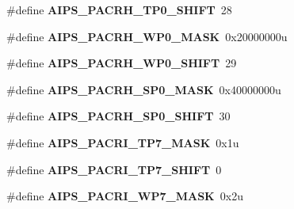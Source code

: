 \begin{DoxyCompactItemize}
\item 
\#define {\bfseries A\+I\+P\+S\+\_\+\+P\+A\+C\+R\+H\+\_\+\+T\+P0\+\_\+\+S\+H\+I\+FT}~28\hypertarget{group__AIPS__Register__Masks_ga7dca4b86d51d4bb3a756d466936c57b3}{}\label{group__AIPS__Register__Masks_ga7dca4b86d51d4bb3a756d466936c57b3}

\item 
\#define {\bfseries A\+I\+P\+S\+\_\+\+P\+A\+C\+R\+H\+\_\+\+W\+P0\+\_\+\+M\+A\+SK}~0x20000000u\hypertarget{group__AIPS__Register__Masks_ga553a81f66ab6f4a89c8ed5edb75d6caf}{}\label{group__AIPS__Register__Masks_ga553a81f66ab6f4a89c8ed5edb75d6caf}

\item 
\#define {\bfseries A\+I\+P\+S\+\_\+\+P\+A\+C\+R\+H\+\_\+\+W\+P0\+\_\+\+S\+H\+I\+FT}~29\hypertarget{group__AIPS__Register__Masks_ga2e196f27c387540cefb7f247c65bd6b4}{}\label{group__AIPS__Register__Masks_ga2e196f27c387540cefb7f247c65bd6b4}

\item 
\#define {\bfseries A\+I\+P\+S\+\_\+\+P\+A\+C\+R\+H\+\_\+\+S\+P0\+\_\+\+M\+A\+SK}~0x40000000u\hypertarget{group__AIPS__Register__Masks_gab6ed580d07b507f6bf5dcdb0e9bcfd5a}{}\label{group__AIPS__Register__Masks_gab6ed580d07b507f6bf5dcdb0e9bcfd5a}

\item 
\#define {\bfseries A\+I\+P\+S\+\_\+\+P\+A\+C\+R\+H\+\_\+\+S\+P0\+\_\+\+S\+H\+I\+FT}~30\hypertarget{group__AIPS__Register__Masks_ga8e524f1e86a8c6fdad36f680445a8edc}{}\label{group__AIPS__Register__Masks_ga8e524f1e86a8c6fdad36f680445a8edc}

\item 
\#define {\bfseries A\+I\+P\+S\+\_\+\+P\+A\+C\+R\+I\+\_\+\+T\+P7\+\_\+\+M\+A\+SK}~0x1u\hypertarget{group__AIPS__Register__Masks_gac933f53ace72a51dfca2af1b99912984}{}\label{group__AIPS__Register__Masks_gac933f53ace72a51dfca2af1b99912984}

\item 
\#define {\bfseries A\+I\+P\+S\+\_\+\+P\+A\+C\+R\+I\+\_\+\+T\+P7\+\_\+\+S\+H\+I\+FT}~0\hypertarget{group__AIPS__Register__Masks_gaf0b52089ffd5e72547a8df691771d7dd}{}\label{group__AIPS__Register__Masks_gaf0b52089ffd5e72547a8df691771d7dd}

\item 
\#define {\bfseries A\+I\+P\+S\+\_\+\+P\+A\+C\+R\+I\+\_\+\+W\+P7\+\_\+\+M\+A\+SK}~0x2u\hypertarget{group__AIPS__Register__Masks_ga9b95f33134cae02f776172edf177e99f}{}\label{group__AIPS__Register__Masks_ga9b95f33134cae02f776172edf177e99f}


\end{DoxyCompactItemize}
